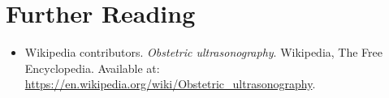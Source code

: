 \section{Further Reading}
\begin{itemize}
  \item Wikipedia contributors. \textit{Obstetric ultrasonography}. Wikipedia, The Free Encyclopedia. Available at: \url{https://en.wikipedia.org/wiki/Obstetric_ultrasonography}.
\end{itemize}
